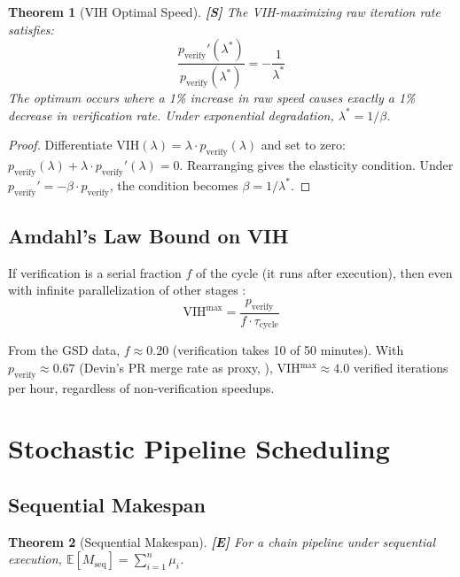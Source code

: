 \documentclass[11pt, a4paper, copyright]{googledeepmind}
\newtheorem{theorem}{Theorem}[section]
\newcommand{\VIH}{\mathrm{VIH}}
\newcommand{\E}{\mathbb{E}}
\begin{document}
\begin{theorem}[VIH Optimal Speed]\label{thm:vih-opt}
\textbf{[S]} The VIH-maximizing raw iteration rate satisfies:
\[
    \frac{p_{\mathrm{verify}}'(\lambda^*)}{p_{\mathrm{verify}}(\lambda^*)} = -\frac{1}{\lambda^*}
\]
The optimum occurs where a 1\% increase in raw speed causes exactly a 1\% decrease in verification rate. Under exponential degradation, $\lambda^* = 1/\beta$.
\end{theorem}

\begin{proof}
Differentiate $\VIH(\lambda) = \lambda \cdot p_{\mathrm{verify}}(\lambda)$ and set to zero: $p_{\mathrm{verify}}(\lambda) + \lambda \cdot p_{\mathrm{verify}}'(\lambda) = 0$. Rearranging gives the elasticity condition. Under $p_{\mathrm{verify}}' = -\beta \cdot p_{\mathrm{verify}}$, the condition becomes $\beta = 1/\lambda^*$.
\end{proof}

\subsection{Amdahl's Law Bound on VIH}

If verification is a serial fraction $f$ of the cycle (it runs after execution), then even with infinite parallelization of other stages \citep{amdahl1967validity}:
\[
    \VIH^{\max} = \frac{p_{\mathrm{verify}}}{f \cdot \tau_{\mathrm{cycle}}}
\]

From the GSD data, $f \approx 0.20$ (verification takes 10 of 50 minutes). With $p_{\mathrm{verify}} \approx 0.67$ (Devin's PR merge rate as proxy, \citealt{cognition2025devin}), VIH$^{\max} \approx 4.0$ verified iterations per hour, regardless of non-verification speedups.


\section{Stochastic Pipeline Scheduling}\label{sec:scheduling}

\subsection{Sequential Makespan}

\begin{theorem}[Sequential Makespan]\label{thm:seq}
\textbf{[E]} For a chain pipeline under sequential execution, $\E[M_{\mathrm{seq}}] = \sum_{i=1}^n \mu_i$.
\end{theorem}
\end{document}
